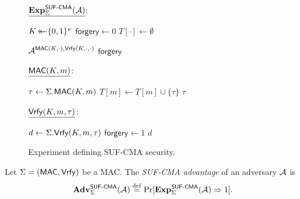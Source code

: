\begin{figure}



\begin{adjustbox}{margin*=2ex,frame,center}
	\begin{minipage}[t]{0.4\textwidth}
			$\underline{\mathbf{Exp}_{\Sigma}^{\operatorname{\mathsf{SUF-CMA}}}(\mathcal{A})}$: 
			\begin{algorithmic}[1]
				\State $K \operatorname{\leftarrow\mathrel{\mkern-14mu}\leftarrow} \lbrace 0, 1 \rbrace^\kappa$
				\State $\mathsf{forgery} \gets 0$
				\State $T[\cdot] \gets \emptyset$
				
				\State
				\State $\mathcal{A}^{\mathsf{MAC}(K, \cdot),\mathsf{Vrfy}(K, \cdot, \cdot)}$ 
				\State \Return $\mathsf{forgery}$	
			\end{algorithmic}
	\end{minipage}
	
	\begin{minipage}[t]{0.4\textwidth}				
			$\underline{\mathsf{MAC}(K, m)}$: 
			\begin{algorithmic}[1]
				\State $\tau \gets \Sigma.\mathsf{MAC}(K, m)$
				\State $T[m] \gets T[m] \cup \lbrace \tau \rbrace$
				\State \Return $\tau$	
			\end{algorithmic}
			
			\vspace{1em}
			
			$\underline{\mathsf{Vrfy}(K, m, \tau)}$: 
			\begin{algorithmic}[1]
				\State $d \gets \Sigma.\mathsf{Vrfy}(K, m, \tau)$
					\State $\mathsf{forgery} \gets 1$
				\EndIf
				\State \Return $d$
			\end{algorithmic}
	\end{minipage}

\end{adjustbox}

\caption{Experiment defining SUF-CMA security.}
\label{fig:MAC_security_experiment}

\end{figure}

\begin{definition}
Let $\Sigma = (\mathsf{MAC}, \mathsf{Vrfy})$ be a MAC. 
The \emph{SUF-CMA advantage} of an adversary $\mathcal{A}$ is 
\begin{equation}
	\mathbf{Adv}_{\Sigma}^{\operatorname{\mathsf{SUF-CMA}}}(\mathcal{A}) \overset{\mathrm{def}}{=} \Pr[\mathbf{Exp}_{\Sigma}^{\operatorname{\mathsf{SUF-CMA}}}(\mathcal{A}) \Rightarrow 1] .
\end{equation}
\end{definition}



